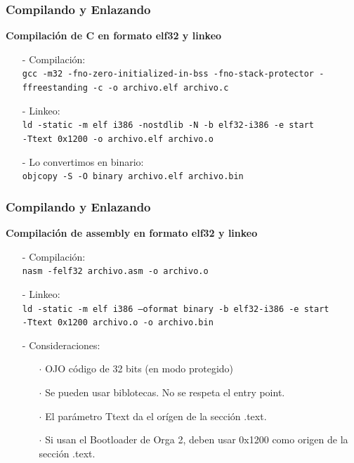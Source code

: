 \documentclass[aspectratio=169]{beamer}
\begin{document}
\begin{frame}
    \frametitle{Compilando y Enlazando}
    \textbf{Compilación de C en formato elf32 y linkeo}\\
    \vspace{0.2cm}
    \begin{itemize}
    \setlength\itemsep{2em}
    \item[-] \textcolor{verdeuca}{Compilación:}\\
    \texttt{gcc -m32 -fno-zero-initialized-in-bss -fno-stack-protector -ffreestanding -c -o archivo.elf archivo.c}
    \item[-] \textcolor{verdeuca}{Linkeo:}\\
    \texttt{ld -static -m elf i386 -nostdlib -N -b elf32-i386 -e start\\ -Ttext 0x1200 -o archivo.elf archivo.o}
    \item[-] \textcolor{verdeuca}{Lo convertimos en binario:}\\
    \texttt{objcopy -S -O binary archivo.elf archivo.bin}
    \end{itemize}
\end{frame}

\begin{frame}
    \frametitle{Compilando y Enlazando}
    \textbf{Compilación de assembly en formato elf32 y linkeo}\\
    \vspace{0.1cm}
    \begin{itemize}
    \setlength\itemsep{1.7em}
    \item[-] \textcolor{verdeuca}{Compilación:}\\
    \texttt{nasm -felf32 archivo.asm -o archivo.o}
    \item[-] \textcolor{verdeuca}{Linkeo:}\\
    \texttt{ld -static -m elf i386 --oformat binary -b elf32-i386 -e start\\ -Ttext 0x1200 archivo.o -o archivo.bin}
    \item[-] \textcolor{verdeuca}{Consideraciones:}
    \begin{itemize}
     \item[$\cdot$] OJO código de 32 bits (en modo protegido)
     \item[$\cdot$] Se pueden usar biblotecas. No se respeta el entry point.
     \item[$\cdot$] El parámetro Ttext da el orígen de la sección .text.
     \item[$\cdot$] Si usan el Bootloader de Orga 2, deben usar 0x1200 como origen de la sección .text.
    \end{itemize}
    \end{itemize}
\end{frame}
\end{document}
